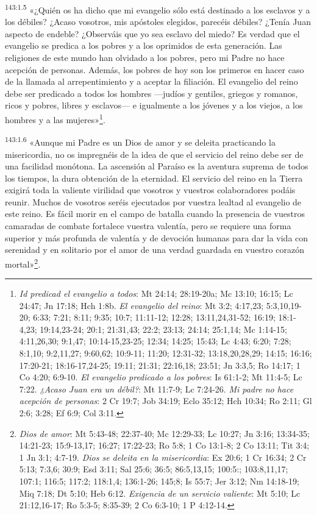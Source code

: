 \par
\textsuperscript{143:1.5} «¿Quién os ha dicho que mi evangelio sólo está destinado a los esclavos y a los débiles? ¿Acaso vosotros, mis apóstoles elegidos, parecéis débiles? ¿Tenía Juan aspecto de endeble? ¿Observáis que yo sea esclavo del miedo? Es verdad que el evangelio se predica a los pobres y a los oprimidos de esta generación. Las religiones de este mundo han olvidado a los pobres, pero mi Padre no hace acepción de personas. Además, los pobres de hoy son los primeros en hacer caso de la llamada al arrepentimiento y a aceptar la filiación. El evangelio del reino debe ser predicado a todos los hombres ---judíos y gentiles, griegos y romanos, ricos y pobres, libres y esclavos--- e igualmente a los jóvenes y a los viejos, a los hombres y a las mujeres»\footnote{\textit{Id predicad el evangelio a todos}: Mt 24:14; 28:19-20a; Mc 13:10; 16:15; Lc 24:47; Jn 17:18; Hch 1:8b. \textit{El evangelio del reino}: Mt 3:2; 4:17,23; 5:3,10,19-20; 6:33; 7:21; 8:11; 9:35; 10:7; 11:11-12; 12:28; 13:11,24,31-52; 16:19; 18:1-4,23; 19:14,23-24; 20:1; 21:31,43; 22:2; 23:13; 24:14; 25:1,14; Mc 1:14-15; 4:11,26,30; 9:1,47; 10:14-15,23-25; 12:34; 14:25; 15:43; Lc 4:43; 6:20; 7:28; 8:1,10; 9:2,11,27; 9:60,62; 10:9-11; 11:20; 12:31-32; 13:18,20,28,29; 14:15; 16:16; 17:20-21; 18:16-17,24-25; 19:11; 21:31; 22:16,18; 23:51; Jn 3:3,5; Ro 14:17; 1 Co 4:20; 6:9-10. \textit{El evangelio predicado a los pobres}: Is 61:1-2; Mt 11:4-5; Lc 7:22. \textit{¿Acaso Juan era un débil?}: Mt 11:7-9; Lc 7:24-26. \textit{Mi padre no hace acepción de personas}: 2 Cr 19:7; Job 34:19; Eclo 35:12; Hch 10:34; Ro 2:11; Gl 2:6; 3:28; Ef 6:9; Col 3:11.}.

\par
\textsuperscript{143:1.6} «Aunque mi Padre es un Dios de amor y se deleita practicando la misericordia, no os impregnéis de la idea de que el servicio del reino debe ser de una facilidad monótona. La ascensión al Paraíso es la aventura suprema de todos los tiempos, la dura obtención de la eternidad. El servicio del reino en la Tierra exigirá toda la valiente virilidad que vosotros y vuestros colaboradores podáis reunir. Muchos de vosotros seréis ejecutados por vuestra lealtad al evangelio de este reino. Es fácil morir en el campo de batalla cuando la presencia de vuestros camaradas de combate fortalece vuestra valentía, pero se requiere una forma superior y más profunda de valentía y de devoción humanas para dar la vida con serenidad y en solitario por el amor de una verdad guardada en vuestro corazón mortal»\footnote{\textit{Dios de amor}: Mt 5:43-48; 22:37-40; Mc 12:29-33; Lc 10:27; Jn 3:16; 13:34-35; 14:21-23; 15:9-13,17; 16:27; 17:22-23; Ro 5:8; 1 Co 13:1-8; 2 Co 13:11; Tit 3:4; 1 Jn 3:1; 4:7-19. \textit{Dios se deleita en la misericordia}: Ex 20:6; 1 Cr 16:34; 2 Cr 5:13; 7:3,6; 30:9; Esd 3:11; Sal 25:6; 36:5; 86:5,13,15; 100:5:; 103:8,11,17; 107:1; 116:5; 117:2; 118:1,4; 136:1-26; 145;8; Is 55:7; Jer 3:12; Nm 14:18-19; Miq 7:18; Dt 5:10; Heb 6:12. \textit{Exigencia de un servicio valiente}: Mt 5:10; Lc 21:12,16-17; Ro 5:3-5; 8:35-39; 2 Co 6:3-10; 1 P 4:12-14.}.

